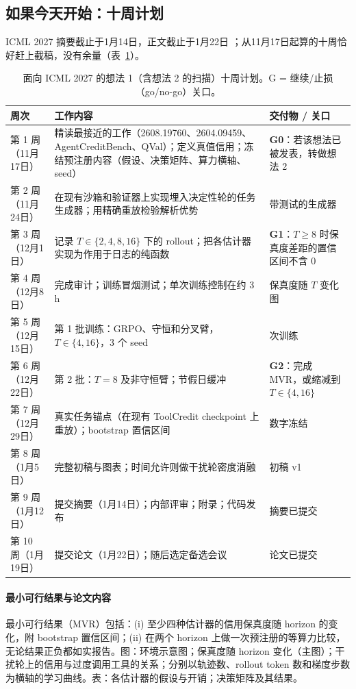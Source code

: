 \subsection{如果今天开始：十周计划}

ICML 2027 摘要截止于1月14日，正文截止于1月22日 \citep{icml2027reciprocal}；从11月17日起算的十周恰好赶上截稿，没有余量（表~\ref{tab:agenda-plan}）。

\begin{table}[t]
\centering
\footnotesize
\caption{面向 ICML 2027 的想法 1（含想法 2 的扫描）十周计划。G = 继续/止损（go/no-go）关口。}
\label{tab:agenda-plan}
\begin{tabularx}{\linewidth}{@{}>{\raggedright\arraybackslash}p{1.5cm}>{\raggedright\arraybackslash}X>{\raggedright\arraybackslash}p{3.2cm}@{}}
\toprule
周次 & 工作内容 & 交付物 / 关口 \\
\midrule
第 1 周（11月17日） & 精读最接近的工作（2608.19760、2604.09459、AgentCreditBench、QVal）；定义真值信用；冻结预注册内容（假设、决策矩阵、算力横轴、seed） & \textbf{G0}：若该想法已被发表，转做想法 2 \\
第 2 周（11月24日） & 在现有沙箱和验证器上实现埋入决定性轮的任务生成器；用精确重放检验解析优势 & 带测试的生成器 \\
第 3 周（12月1日） & 记录 $T\in\{2,4,8,16\}$ 下的 rollout；把各估计器实现为作用于日志的纯函数 & \textbf{G1}：$T\geq8$ 时保真度差距的置信区间不含 0 \\
第 4 周（12月8日） & 完成审计；训练冒烟测试；单次训练控制在约 3\,h & 保真度随 $T$ 变化图 \\
第 5 周（12月15日） & 第 1 批训练：GRPO、守恒和分叉臂，$T\in\{4,16\}$，3 个 seed & 18 次训练 \\
第 6 周（12月22日） & 第 2 批：$T{=}8$ 及非守恒臂；节假日缓冲 & \textbf{G2}：完成 MVR，或缩减到 $T\in\{4,16\}$ \\
第 7 周（12月29日） & 真实任务锚点（在现有 ToolCredit checkpoint 上重放）；bootstrap 置信区间 & 数字冻结 \\
第 8 周（1月5日） & 完整初稿与图表；时间允许则做干扰轮密度消融 & 初稿 v1 \\
第 9 周（1月12日） & 提交摘要（1月14日）；内部评审；附录；代码发布 & 摘要已提交 \\
第 10 周（1月19日） & 提交论文（1月22日）；随后选定备选会议 & 论文已提交 \\
\bottomrule
\end{tabularx}
\end{table}

\paragraph{最小可行结果与论文内容}
最小可行结果（MVR）包括：(i) 至少四种估计器的信用保真度随 horizon 的变化，附 bootstrap 置信区间；(ii) 在两个 horizon 上做一次预注册的等算力比较，无论结果正负都如实报告。图：环境示意图；保真度随 horizon 变化（主图）；干扰轮上的信用与过度调用工具的关系；分别以轨迹数、rollout token 数和梯度步数为横轴的学习曲线。表：各估计器的假设与开销；决策矩阵及其结果。

